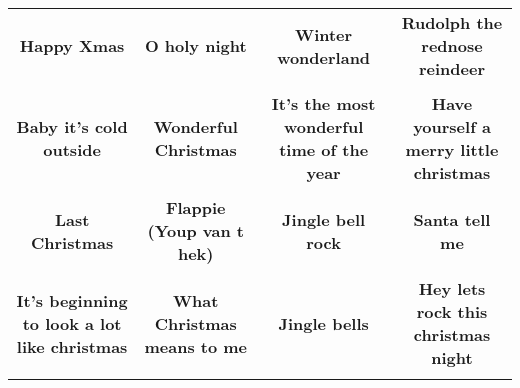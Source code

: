 \documentclass[12pt]{article} \usepackage{eso-pic, graphicx}
\newcommand{\background}[1]{%
\AddToShipoutPictureBG*{\texttt{[image: \#1]}}
}
\begin{document}
\tabcolsep=30.2pt \renewcommand{\arraystretch}{4.5}   \vspace*{4.3cm} \begin{center}  \begin{tabular}{c c c c}
\parbox{3cm}{\centering \textbf{Happy Xmas}}& 
\parbox{3cm}{\centering \textbf{O holy night}}& 
\parbox{3cm}{\centering \textbf{Winter wonderland}}& 
\parbox{3cm}{\centering \textbf{Rudolph the rednose reindeer}}\\ \\ 
\parbox{3cm}{\centering \textbf{Baby it’s cold outside}}& 
\parbox{3cm}{\centering \textbf{Wonderful Christmas}}& 
\parbox{3cm}{\centering \textbf{It’s the most wonderful time of the year}}& 
\parbox{3cm}{\centering \textbf{Have yourself a merry little christmas}}\\ \\ 
\parbox{3cm}{\centering \textbf{Last Christmas}}& 
\parbox{3cm}{\centering \textbf{Flappie (Youp van t hek)}}& 
\parbox{3cm}{\centering \textbf{Jingle bell rock}}& 
\parbox{3cm}{\centering \textbf{Santa tell me}}\\ \\ 
\parbox{3cm}{\centering \textbf{It’s beginning to look a lot like christmas}}& 
\parbox{3cm}{\centering \textbf{What Christmas means to me}}& 
\parbox{3cm}{\centering \textbf{Jingle bells}}& 
\parbox{3cm}{\centering \textbf{Hey lets rock this christmas night}}\\ \\ 
\end{tabular} \background{discobingo.pdf} \end{center} 
\end{document}
